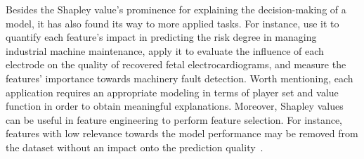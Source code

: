 Besides the Shapley value's prominence for explaining the decision-making of a model, it has also found its way to more applied tasks.
For instance, \citet{Nimmy2023} use it to quantify each feature's impact in predicting the risk degree in managing industrial machine maintenance,
\citet{Pelegrina2023b} apply it to evaluate the influence of each electrode on the quality of recovered fetal electrocardiograms, and \citet{Brusa2023} measure the features' importance towards machinery fault detection.
Worth mentioning, each application requires an appropriate modeling in terms of player set and value function in order to obtain meaningful explanations.
Moreover, Shapley values can be useful in feature engineering to perform feature selection.
For instance, features with low relevance towards the model performance may be removed from the dataset without an impact onto the prediction quality~\citep{Pelegrina2024}.